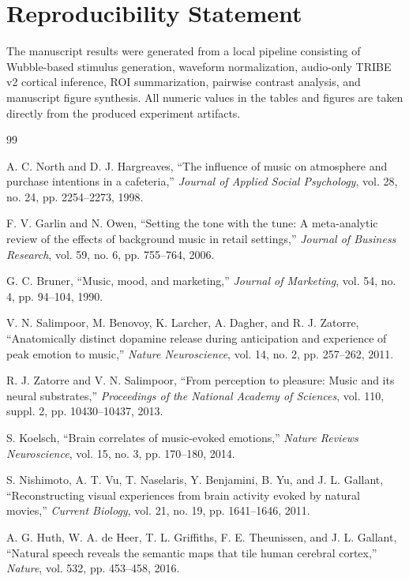 \documentclass[conference]{IEEEtran}
\begin{document}
\section*{Reproducibility Statement}

The manuscript results were generated from a local pipeline consisting of Wubble-based stimulus generation, waveform normalization, audio-only TRIBE v2 cortical inference, ROI summarization, pairwise contrast analysis, and manuscript figure synthesis. All numeric values in the tables and figures are taken directly from the produced experiment artifacts.

\begin{thebibliography}{99}

A. C. North and D. J. Hargreaves, ``The influence of music on atmosphere and purchase intentions in a cafeteria,'' \emph{Journal of Applied Social Psychology}, vol. 28, no. 24, pp. 2254--2273, 1998.

F. V. Garlin and N. Owen, ``Setting the tone with the tune: A meta-analytic review of the effects of background music in retail settings,'' \emph{Journal of Business Research}, vol. 59, no. 6, pp. 755--764, 2006.

G. C. Bruner, ``Music, mood, and marketing,'' \emph{Journal of Marketing}, vol. 54, no. 4, pp. 94--104, 1990.

V. N. Salimpoor, M. Benovoy, K. Larcher, A. Dagher, and R. J. Zatorre, ``Anatomically distinct dopamine release during anticipation and experience of peak emotion to music,'' \emph{Nature Neuroscience}, vol. 14, no. 2, pp. 257--262, 2011.

R. J. Zatorre and V. N. Salimpoor, ``From perception to pleasure: Music and its neural substrates,'' \emph{Proceedings of the National Academy of Sciences}, vol. 110, suppl. 2, pp. 10430--10437, 2013.

S. Koelsch, ``Brain correlates of music-evoked emotions,'' \emph{Nature Reviews Neuroscience}, vol. 15, no. 3, pp. 170--180, 2014.

S. Nishimoto, A. T. Vu, T. Naselaris, Y. Benjamini, B. Yu, and J. L. Gallant, ``Reconstructing visual experiences from brain activity evoked by natural movies,'' \emph{Current Biology}, vol. 21, no. 19, pp. 1641--1646, 2011.

A. G. Huth, W. A. de Heer, T. L. Griffiths, F. E. Theunissen, and J. L. Gallant, ``Natural speech reveals the semantic maps that tile human cerebral cortex,'' \emph{Nature}, vol. 532, pp. 453--458, 2016.


\end{thebibliography}
\end{document}
